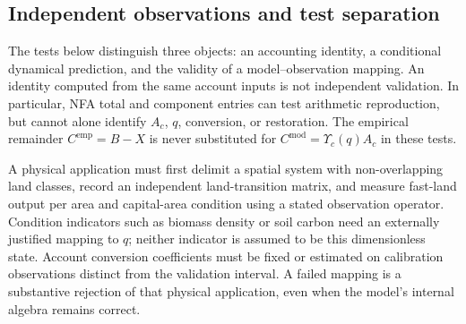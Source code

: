 \documentclass[11pt,a4paper]{article}
\newcommand{\Ups}{\Upsilon_c}
\begin{document}
\subsection{Independent observations and test separation}
The tests below distinguish three objects: an accounting identity, a conditional dynamical prediction, and the validity of a model--observation mapping. An identity computed from the same account inputs is not independent validation. In particular, NFA total and component entries can test arithmetic reproduction, but cannot alone identify $A_c$, $q$, conversion, or restoration. The empirical remainder $C^{\mathrm{emp}}=B-X$ is never substituted for $C^{\mathrm{mod}}=\Ups(q)A_c$ in these tests.

A physical application must first delimit a spatial system with non-overlapping land classes, record an independent land-transition matrix, and measure fast-land output per area and capital-area condition using a stated observation operator. Condition indicators such as biomass density or soil carbon need an externally justified mapping to $q$; neither indicator is assumed to be this dimensionless state. Account conversion coefficients must be fixed or estimated on calibration observations distinct from the validation interval. A failed mapping is a substantive rejection of that physical application, even when the model's internal algebra remains correct.
\end{document}
